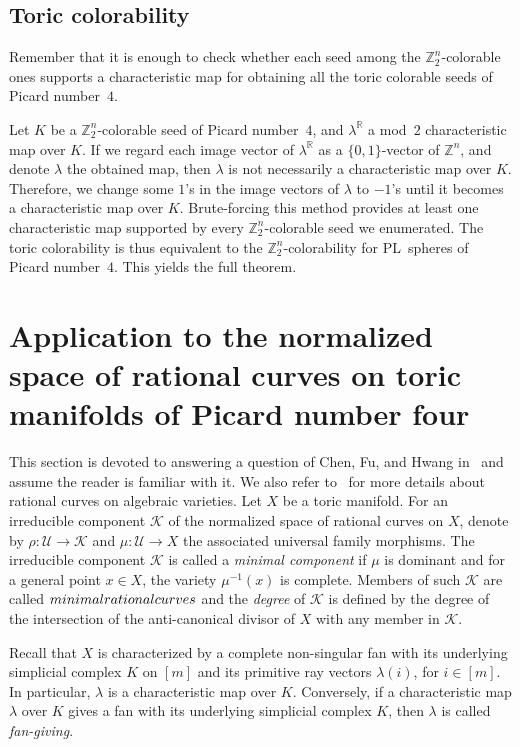 \documentclass[11pt]{amsart}
\theoremstyle{plain}
\numberwithin{equation}{section}
\theoremstyle{definition}
\newcommand{\cK}{\mathcal{K}}
\newcommand{\cU}{\mathcal{U}}
\newcommand{\R}{\mathbb{R}}
\newcommand{\Z}{\mathbb{Z}}
\begin{document}
\subsection{Toric colorability} \label{subsectoin:toric_colorable}

Remember that it is enough to check whether each seed among the $\Z_2^n$-colorable ones supports a characteristic map for obtaining all the toric colorable seeds of Picard number~$4$.

Let $K$ be a $\Z_2^n$-colorable seed of Picard number~$4$, and $\lambda^\R$ a mod~$2$ characteristic map over $K$.
If we regard each image vector of $\lambda^\R$ as a $\{0,1\}$-vector of $\Z^n$, and denote $\lambda$ the obtained map, then $\lambda$ is not necessarily a characteristic map over $K$.
Therefore, we change some $1$'s in the image vectors of $\lambda$ to $-1$'s until it becomes a characteristic map over $K$.
Brute-forcing this method provides at least one characteristic map supported by every $\Z_2^n$-colorable seed we enumerated.
The toric colorability is thus equivalent to the $\Z_2^n$-colorability for PL~spheres of Picard number~$4$.
This yields the full theorem.
\main

\section{Application to the normalized space of rational curves on toric manifolds of Picard number four} \label{sec:min_comp}
This section is devoted to answering a question of Chen, Fu, and Hwang in~\cite{fu2014minimal} and assume the reader is familiar with it.
We also refer to~\cite{Kollar_1995,Hwang_2001} for more details about rational curves on algebraic varieties.
Let $X$ be a toric manifold.
For an irreducible component $\cK$ of the normalized space of rational curves on $X$, denote by $\rho \colon \cU \longrightarrow \cK$ and $\mu \colon \cU \longrightarrow X$ the associated universal family morphisms.
The irreducible component $\cK$ is called a \emph{minimal component} if $\mu$ is dominant and for a general point $x \in X$, the variety $\mu^{-1}(x)$ is complete.
Members of such $\cK$ are called $\emph{minimal rational curves}$ and the \emph{degree} of $\cK$ is defined by the degree of the intersection of the anti-canonical divisor of $X$ with any member in $\cK$.

Recall that $X$ is characterized by a complete non-singular fan with its underlying simplicial complex $K$ on $[m]$ and its primitive ray vectors $\lambda(i)$, for $i \in [m]$.
In particular, $\lambda$ is a characteristic map over $K$.
Conversely, if a characteristic map $\lambda$ over $K$ gives a fan with its underlying simplicial complex $K$, then $\lambda$ is called \emph{fan-giving}.
\end{document}
